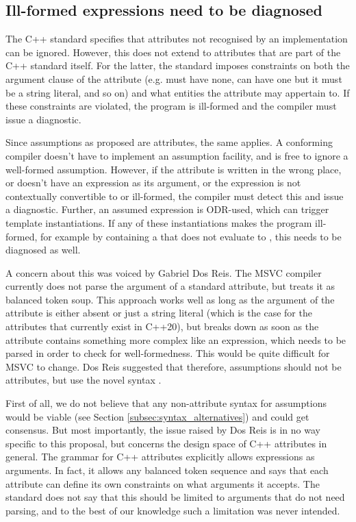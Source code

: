 \subsection{Ill-formed expressions need to be diagnosed}
\label{subsec:well_formed}

The C++ standard specifies that attributes not recognised by an implementation can be ignored. However, this does not extend to attributes that are part of the C++ standard itself. For the latter, the standard imposes constraints on both the argument clause of the attribute (e.g. \tcode{[[noreturn]]} must have none, \tcode{[[deprecated]]} can have one but it must be a string literal, and so on) and what entities the attribute may appertain to. If these constraints are violated, the program is ill-formed and the compiler must issue a diagnostic.

Since assumptions as proposed are attributes, the same applies. A conforming compiler doesn't have to implement an assumption facility, and is free to  ignore a well-formed assumption. However, if the  attribute is written in the wrong place, or doesn't have an expression as its argument, or the expression is not contextually convertible to  or ill-formed, the compiler must detect this and issue a diagnostic. Further, an assumed expression is ODR-used, which can trigger template instantiations. If any of these instantiations makes the program ill-formed, for example by containing a  that does not evaluate to , this needs to be diagnosed as well.

A concern about this was voiced by Gabriel Dos Reis. The MSVC compiler currently does not parse the argument of a standard attribute, but treats it as balanced token soup. This approach works well as long as the argument of the attribute is either absent or just a string literal (which is the case for the attributes that currently exist in C++20), but breaks down as soon as the attribute contains something more complex like an expression, which needs to be parsed in order to check for well-formedness. This would be quite difficult for MSVC to change. Dos Reis suggested that therefore, assumptions should not be attributes, but use the novel syntax .

First of all, we do not believe that any non-attribute syntax for assumptions would be viable (see Section \ref{subsec:syntax_alternatives}) and could get consensus. But most importantly, the issue raised by Dos Reis is in no way specific to this proposal, but concerns the design space of C++ attributes in general. The grammar for C++ attributes explicitly allows expressions as arguments. In fact, it allows any balanced token sequence and says that each attribute can define its own constraints on what arguments it accepts. The standard does not say that this should be limited to arguments that do not need parsing, and to the best of our knowledge such a limitation was never intended.

